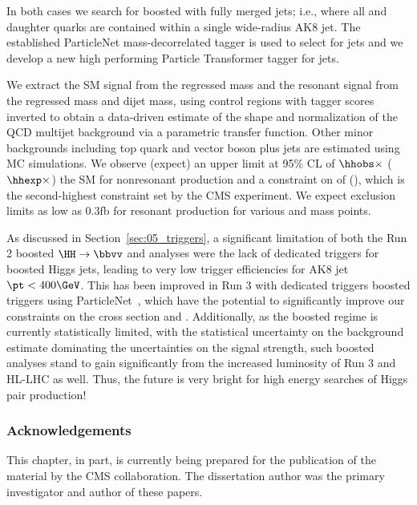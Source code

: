 In both cases we search for boosted \HHY with fully merged jets; i.e., where all \PH and \PY daughter quarks are contained within a single wide-radius AK8 jet.
The established ParticleNet mass-decorrelated tagger is used to select for \hbb jets and we develop a new high performing Particle Transformer tagger for \hyvv jets.

We extract the SM \HH signal from the \hbb regressed mass and the resonant \XHY signal from the \yww regressed mass and dijet \PX mass, using control regions with tagger scores inverted to obtain a data-driven estimate of the shape and normalization of the QCD multijet background via a parametric transfer function.
Other minor backgrounds including top quark and vector boson plus jets are estimated using MC simulations.
We observe (expect) an upper limit at 95\% CL of $\hhobs\times$ ($\hhexp\times$) the SM for nonresonant \HHbbVVq production and a constraint on \kapvv of \kvvobslims (\kvvexplims), which is the second-highest constraint set by the CMS experiment.
We expect exclusion limits as low as 0.3fb for resonant \XHYbbVVq production for various \mx and \my mass points.

As discussed in Section~\ref{sec:05_triggers}, a significant limitation of both the Run 2 boosted $\HH\to\bbvv$ and \bbbb analyses were the lack of dedicated triggers for boosted Higgs jets, leading to very low trigger efficiencies for AK8 jet $\pt < 400\GeV$.
This has been improved in Run 3 with dedicated triggers boosted \hbb triggers using ParticleNet~\cite{Varghese:2023bue}, which have the potential to significantly improve our constraints on the \HH cross section and \kapvv.
Additionally, as the boosted regime is currently statistically limited, with the statistical uncertainty on the background estimate dominating the uncertainties on the signal strength, such boosted \HH analyses stand to gain significantly from the increased luminosity of Run 3 and HL-LHC as well.
Thus, the future is very bright for high energy searches of Higgs pair production!

\subsubsection{Acknowledgements}

This chapter, in part, is currently being prepared for the publication of the material by the CMS collaboration.
The dissertation author was the primary investigator and author of these papers.